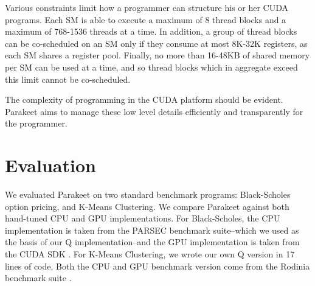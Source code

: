 \documentclass[preprint]{sigplanconf}
\begin{document}
Various constraints limit how a programmer can structure his or her CUDA
programs.  Each SM is able to execute a maximum of 8 thread blocks and
a maximum of 768-1536 threads at a time.  In addition, a group of thread blocks
can be co-scheduled on an SM only if they consume at most 8K-32K registers, as
each SM shares a register pool.  Finally, no more than 16-48KB of shared
memory per SM can be used at a time, and so thread blocks which in aggregate
exceed this limit cannot be co-scheduled.

The complexity of programming in the CUDA platform should be evident.  Parakeet
aims to manage these low level details efficiently and transparently for the
programmer.

%

\section{Evaluation}
\label{Evaluation}

We evaluated Parakeet on two standard benchmark programs: Black-Scholes option
pricing, and K-Means Clustering.  We compare Parakeet against both hand-tuned
CPU and GPU implementations.  For Black-Scholes, the CPU implementation is
taken from the PARSEC \cite{Bien08} benchmark suite--which we used as the basis
of our Q implementation--and the GPU implementation is taken from the CUDA SDK
\cite{NvidSD}.  For K-Means Clustering, we wrote our own Q version in 17 lines
of code.  Both the CPU and GPU benchmark version come from the Rodinia
benchmark suite \cite{Che09}.
\end{document}
